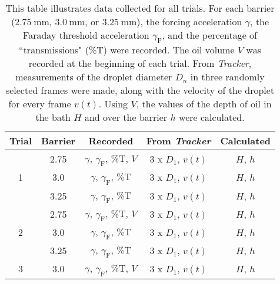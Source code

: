 \begin{table}[h]
\caption{This table illustrates data collected for all trials. For each barrier ($2.75~\mathrm{mm}$, $3.0~\mathrm{mm}$, or $3.25~\mathrm{mm}$), the forcing acceleration $\gamma$, the Faraday threshold acceleration $\gamma_\mathrm{F}$, and the percentage of ``transmissions" (\%T) were recorded. The oil volume $V$ was recorded at the beginning of each trial. From \textit{Tracker}, measurements of the droplet diameter $D_n$ in three randomly selected frames were made, along with the velocity of the droplet for every frame $v(t)$. Using $V$, the values of the depth of oil in the bath $H$ and over the barrier $h$ were calculated.}
\begin{center}
\begin{tabular}{ccccc}

\hline
Trial & Barrier & Recorded & From \textit{Tracker}  & Calculated \\
\hline
\multirow{3}{*}{1} & 2.75 & $\gamma$, $\gamma_\mathrm{F}$, \%T, $V$ & {3 x }$D_1$, $v(t)$ & $H$, $h$ \\
                   & 3.0 & $\gamma$, $\gamma_\mathrm{F}$, \%T & {3 x }$D_1$, $v(t)$ & $H$, $h$   \\
                   & 3.25 & $\gamma$, $\gamma_\mathrm{F}$, \%T & {3 x }$D_1$, $v(t)$ & $H$, $h$  \\
                   \hline
\multirow{3}{*}{2} & 2.75 & $\gamma$, $\gamma_\mathrm{F}$, \%T, $V$ & {3 x }$D_1$, $v(t)$ & $H$, $h$ \\
                   & 3.0 & $\gamma$, $\gamma_\mathrm{F}$, \%T & {3 x }$D_1$, $v(t)$ & $H$, $h$   \\
                   & 3.25 & $\gamma$, $\gamma_\mathrm{F}$, \%T & {3 x }$D_1$, $v(t)$ & $H$, $h$  \\
                   \hline
\multirow{1}{*}{3} & 3.0 & $\gamma$, $\gamma_\mathrm{F}$, \%T, $V$ & {3 x }$D_1$, $v(t)$ & $H$, $h$ \\   
\hline         
                     
\end{tabular}
\end{center} 
\label{datacollection} 
\end{table}


